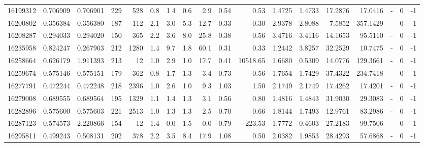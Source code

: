\begin{tabular}{rrrrrrrrrrrrrrrlrr}
  16199312 & 0.706909 &   0.706901 &  229 &  528 &      0.8 &      1.4 &     0.6 &      2.9 &       0.54 &        0.53 &  1.4725 &  1.4733 &   17.2876 &   17.0416 &             - &        0 &         -1 \\
  16200802 & 0.356384 &   0.356380 &  187 &  112 &      2.1 &      3.0 &     5.3 &     12.7 &       0.33 &        0.30 &  2.9378 &  2.8088 &    7.5852 &  357.1429 &             - &        0 &         -1 \\
  16208287 & 0.294033 &   0.294020 &  150 &  365 &      2.2 &      3.6 &     8.0 &     25.8 &       0.38 &        0.56 &  3.4716 &  3.4116 &   14.1653 &   95.5110 &             - &        0 &         -1 \\
  16235958 & 0.824247 &   0.267903 &  212 & 1280 &      1.4 &      9.7 &     1.8 &     60.1 &       0.31 &        0.33 &  1.2442 &  3.8257 &   32.2529 &   10.7475 &             - &        0 &         -1 \\
  16258664 & 0.626179 &   1.911393 &  213 &   12 &      1.0 &      2.9 &     1.0 &     17.7 &       0.41 &    10518.65 &  1.6680 &  0.5309 &   14.0776 &  129.3661 &             - &        0 &         -1 \\
  16259674 & 0.575146 &   0.575151 &  179 &  362 &      0.8 &      1.7 &     1.3 &      3.4 &       0.73 &        0.56 &  1.7654 &  1.7429 &   37.4322 &  234.7418 &             - &        0 &         -1 \\
  16277791 & 0.472244 &   0.472248 &  218 & 2396 &      1.0 &      2.6 &     1.0 &      9.3 &       1.03 &        1.50 &  2.1749 &  2.1749 &   17.4262 &   17.4201 &             - &        0 &         -1 \\
  16279008 & 0.689555 &   0.689564 &  195 & 1329 &      1.1 &      1.4 &     1.3 &      3.1 &       0.56 &        0.80 &  1.4816 &  1.4843 &   31.9030 &   29.3083 &             - &        0 &         -1 \\
  16282896 & 0.575600 &   0.575603 &  221 & 2513 &      1.0 &      1.3 &     1.3 &      2.5 &       0.70 &        0.66 &  1.8144 &  1.7493 &   12.9761 &   83.2986 &             - &        0 &         -1 \\
  16287123 & 0.574573 &   2.220866 &  154 &   12 &      1.4 &      0.0 &     1.5 &      0.0 &       0.79 &      223.53 &  1.7772 &  0.4603 &   27.2183 &   99.7506 &             - &        0 &         -1 \\
  16295811 & 0.499243 &   0.508131 &  202 &  378 &      2.2 &      3.5 &     8.4 &     17.9 &       1.08 &        0.50 &  2.0382 &  1.9853 &   28.4293 &   57.6868 &             - &        0 &         -1 \\

\end{tabular}
